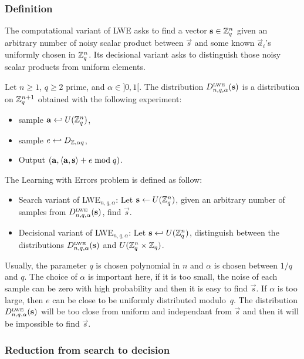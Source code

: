 \subsubsection{Definition}

The computational variant of LWE asks to find a vector $\vec{s} \in \mZ_q^n$ given an arbitrary number of noisy scalar product between $\vec{s}$ and some known $\vec{a}_i$'s uniformly chosen in $\mZ_q^n$. Its decisional variant asks to distinguish those noisy scalar products from uniform elements.

\begin{definition}
Let $n \geq 1$, $q\geq 2$ prime, and $\alpha \in ]0,1[$. The distribution $D^{\mbox{\tiny LWE}}_{n,q,\alpha}(\vec{s})$ is a distribution on
$\mZ_q^{n+1}$ obtained with the following experiment: 
\begin{itemize}
\item sample $\vec{a} \hookleftarrow U(\mZ_q^n)$,
\item sample $e \hookleftarrow D_{\mZ,\alpha q}$,
\item Output $(\vec{a}, \ps{\vec{a}}{\vec{s}} +  e \bmod q )$.
\end{itemize}
The Learning with Errors problem is defined as follow:
\begin{itemize}
\item Search variant of LWE$_{n,q,\alpha}$: Let $\vec{s} \leftarrow U(\mZ_q^{n})$, given an arbitrary number of samples from $D^{\mbox{\tiny LWE}}_{n,q,\alpha}(\vec{s})$, find $\vec{s}$.
\item Decisional variant of LWE$_{n,q,\alpha}$: Let $\vec{s}\hookleftarrow U(\mZ_q^{n})$,  distinguish between the distributions $D^{\mbox{\tiny LWE}}_{n,q,\alpha}(\vec{s})$ and $U(\mZ_q^{n} \times \mZ_q)$.
\end{itemize}
\end{definition}

Usually, the parameter $q$ is chosen polynomial in $n$ and $\alpha$ is chosen between $1/q$ and $q$.
The choice of $\alpha$ is important here, if it is too small, the noise of each sample can be zero with high probability and then it is easy to find $\vec{s}$. If $\alpha$ is too large, then $e$ can be close to be uniformly distributed modulo~$q$. The distribution $D^{\mbox{\tiny LWE}}_{n,q,\alpha}(\vec{s})$ will be too close from uniform and independant from $\vec{s}$ and then it will be impossible to find $\vec{s}$.




\subsubsection{Reduction from search to decision}

